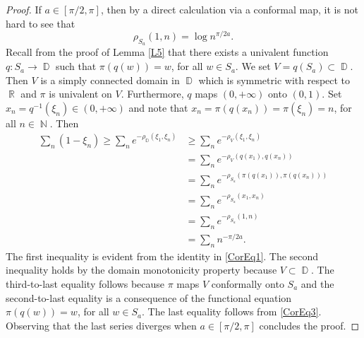 \documentclass[11pt, letterpaper,leqno]{amsart}
\numberwithin{equation}{section}
\theoremstyle{definition}
\DeclareMathOperator{\D}{\mathbb{D}}
\DeclareMathOperator{\N}{\mathbb{N}}
\DeclareMathOperator{\R}{\mathbb{R}}
\begin{document}
\begin{proof}
If $a\in [\pi/2,\pi]$, then by a direct calculation via a conformal map, it is not hard to see that
\begin{equation}\label{CorEq3}
\rho_{S_a}(1,n)=\log n^{\pi/2a}.
\end{equation}
Recall from the proof of Lemma \ref{L5} that there exists a univalent function $q:S_a\to\D$ such that $\pi(q(w))=w$, for all $w\in S_a$. We set $V=q(S_a)\subset\D$. Then $V$ is a simply connected domain in $\D$ which is symmetric with respect to $\R$ and $\pi$ is univalent on $V$. Furthermore, $q$ maps $(0,+\infty)$ onto $(0,1)$. Set $x_n=q^{-1}(\xi_n)\in (0,+\infty)$ and note that $x_n=\pi(q(x_n))=\pi(\xi_n)=n$, for all $n\in\N$. Then
\begin{align*}
\sum_n\left(1-\xi_n\right)\geq \sum_n e^{-\rho_{\D}(\xi_1,\xi_n)}&\geq \sum_n e^{-\rho_V(\xi_1,\xi_n)}\\
&=\sum_n e^{-\rho_{V}(q(x_1),q(x_n))}\\
&=\sum_n e^{-\rho_{S_a}(\pi(q(x_1)),\pi(q(x_n)))}\\
&=\sum_n e^{-\rho_{S_a}(x_1,x_n)}\\
&=\sum_n e^{-\rho_{S_a}(1,n)}\\
&=\sum_n n^{-\pi/2a}.
\end{align*}
The first inequality is evident from the identity in \eqref{CorEq1}. The second inequality holds by the domain monotonicity property because $V\subset\D$. The third-to-last equality follows because $\pi$ maps $V$ conformally onto $S_a$ and the second-to-last equality is a consequence of the functional equation $\pi(q(w))=w$, for all $w\in S_a$. The last equality follows from \eqref{CorEq3}. Observing that the last series diverges when $a\in [\pi/2,\pi]$ concludes the proof. 
\end{proof}
\end{document}
